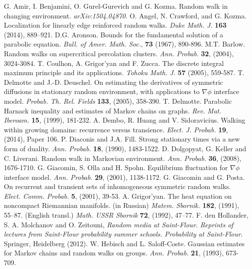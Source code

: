 \documentclass[12pt,reqno]{amsart}
\numberwithin{equation}{section}
\theoremstyle{definition}
\begin{document}
\begin{thebibliography}{99}
G. Amir, I. Benjamini, O. Gurel-Gurevich and G. Kozma. Random walk in changing environment. {\emph{arXiv:1504.04870}}.
O. Angel, N. Crawford, and G. Kozma. Localization for linearly edge reinforced random walks. {\emph{Duke Math. J.}} {\bf{163}} (2014), 
889--921. 
D.G. Aronson. Bounds for the fundamental solution of a parabolic equation. {\emph{Bull. 
of Amer. Math. Soc.}}, {\bf{73}} (1967), 890-896.
M.T. Barlow. Random walks on supercritical percolation clusters. {\emph{Ann. Probab.}} 
{\bf{32}}, 
(2004), 3024-3084.
T. Coulhon, A. Grigor'yan and F. Zucca. The discrete integral maximum principle and its applications. {\emph{Tohoku Math. J.}} {\bf{57}} (2005), 559-587.
T. Delmotte and J.-D. Deuschel. On estimating the derivatives of symmetric diffusions in stationary random environment, with applications to ${\nabla}\phi$ interface model. {\emph{Probab. Th. Rel. Fields}} {\bf{133}}, (2005), 358-390.
T. Delmotte. Parabolic Harnack inequality and estimates of Markov chains on graphs. {\emph{Rev. Mat. Iberoam.}} {\bf{15}}, 
(1999), 181-232.
A. Dembo, R. Huang and V. Sidoravicius. Walking within growing domains: recurrence versus transience. {\emph{Elect. J. Probab.}} {\bf 19}, (2014), Paper 106.
P. Diaconis and J.A. Fill. Strong stationary times via a new form of duality. {\emph{Ann. Probab.}} {\bf 18}, 
(1990), 1483-1522.
D. Dolgopyat, G. Keller and C. Liverani. Random walk in Markovian environment. {\emph{Ann. Probab.}}
{\bf{ 36}}, 
(2008), 1676-1710.
G. Giacomin, S. Olla and H. Spohn. Equilibrium fluctuation for ${\nabla}\phi$ interface model. {\emph{Ann. Probab.}} {\bf 29}, (2001), 
1138-1172.
G. Giacomin and G. Posta. On recurrent and transient sets of inhomogeneous symmetric random walks. {\emph{Elect. Comm. Probab.}} {\bf{5}}, (2001), 39-53.
A. Grigor'yan. 
The heat equation on noncompact Riemannian manifolds. 
(in Russian) {\emph{Matem. Sbornik.}} {\bf 182}, (1991), 55--87.
(English transl.) {\emph{Math. USSR Sbornik}} {\bf 72}, (1992), 47--77.
F. den Hollander, S. A. Molchanov and O. Zeitouni, {\emph{Random media at Saint-Flour. 
Reprints of lectures from Saint-Flour probability 
summer schools. Probability at Saint-Flour}}. Springer, Heidelberg (2012).
W. Hebisch and L. Saloff-Coste. Gaussian estimates for Markov chains and random walks on groups. {\emph{Ann. Probab.}} {\bf{21}}, (1993), 673-709.

\end{thebibliography}
\end{document}

